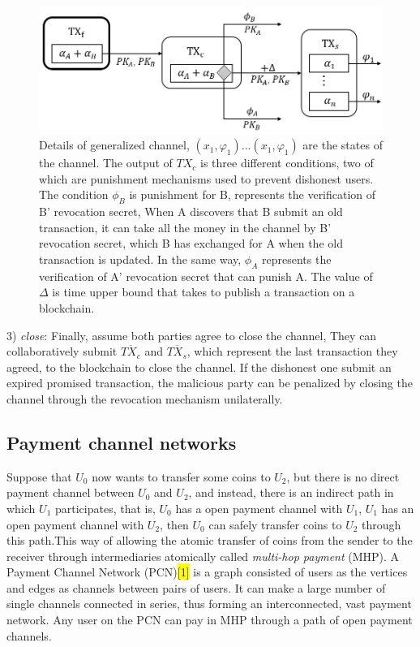 \documentclass[conference]{IEEEtran}
\begin{document}
\begin{figure}[t]
	\centering
	\includegraphics[scale=0.45]{fig3.png}
	\caption{Details of generalized channel, $(x_1,\varphi_1)...(x_1,\varphi_1)$ are the states of the channel. 
	The output of $TX_c$ is three different conditions, two of which are punishment mechanisms used to prevent 
	dishonest users. The condition $\phi_B$ is punishment for B, represents the verification of B’ revocation 
	secret, When A discovers that B submit an old transaction, it can take all the money in the channel by B' 
	revocation secret, which B has exchanged for A when the old transaction is updated. In the same way, $\phi_A$ 
	represents the verification of A’ revocation secret that can punish A. The value of $\Delta$ is time upper 
	bound that takes to publish a transaction on a blockchain.
	}
\end{figure}

3) \emph{close}: Finally, assume both parties agree to close the channel, They can collaboratively submit $\overline{TX_c}$ 
and $\overline{TX_s}$, which represent the last transaction they agreed, to the blockchain to close the channel. If the 
dishonest one submit an expired promised transaction, the malicious party can be penalized by closing the channel through 
the revocation mechanism unilaterally.

\subsection{Payment channel networks}
Suppose that $U_0$ now wants to transfer some coins to $U_2$, but there is no direct payment channel between $U_0$ and $U_2$, 
and instead, there is an indirect path in which $U_1$ participates, that is, $U_0$ has a open payment channel with $U_1$, $U_1$ 
has an open payment channel with $U_2$, then $U_0$ can safely transfer coins to $U_2$ through this path.This way of allowing 
the atomic transfer of coins from the sender to the receiver through intermediaries atomically called \emph{multi-hop payment} (MHP). 
A Payment Channel Network (PCN)\colorbox{yellow}{[1]} is a graph consisted of users as the vertices and edges as channels between 
pairs of users. It can make a large number of single channels connected in series, thus forming an interconnected, vast payment network. 
Any user on the PCN can pay in MHP through a path of open payment channels. 
\end{document}

